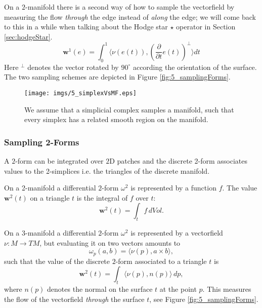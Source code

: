 On a $2$-manifold there is a second way of how to sample the vectorfield by measuring the flow \emph{through} the edge instead of \emph{along} the edge; we will come back to this in a while when talking about the Hodge star $\star$ operator in Section \ref{sec:hodgeStar}. 
\[\textbf{w}^1(e) = \int_{0}^1 \langle\nu(e(t)),(\frac{\partial}{\partial t}e(t))^\perp \rangle dt\]
Here $^\perp$ denotes the vector rotated by $90^\circ$ according the orientation of the surface. The two sampling schemes are depicted in Figure \ref{fig:5_samplingForms}.


\begin{figure}%
\begin{center}
\texttt{[image: imgs/5\_simplexVsMF.eps]}%
\end{center}
\vspace{-0.5cm}
\caption{We assume that a simplicial complex samples a manifold, such that every simplex has a related smooth region on the manifold.}%
\label{fig:5_simplexVsMF}%
\end{figure}

\subsubsection{Sampling 2-Forms}
A $2$-form can be integrated over $2$D patches and the discrete 2-form associates values to the 2-simplices i.e. the triangles of the discrete manifold.

On a 2-manifold a differential $2$-form $\omega^2$ is represented by a function $f$. The value $\textbf{w}^2(t)$ on a triangle $t$ is the integral of $f$ over $t$:
\[\textbf{w}^2(t)= \int_{t} f\, dVol.\]

On a 3-manifold a differential $2$-form $\omega^2$ is represented by a vectorfield $\nu: M\to TM$, but evaluating it on two vectors amounts to
\[\omega_p(a,b) = \langle \nu(p) , a \times b \rangle,\]
such that the value of the discrete $2$-form associated to a triangle $t$ is
\[\textbf{w}^2(t)= \int_{t} \langle \nu(p), n(p) \rangle \, dp,\]
where $n(p)$ denotes the normal on the surface $t$ at the point $p$. This measures the flow of the vectorfield \emph{through} the surface $t$, see Figure \ref{fig:5_samplingForms}.


